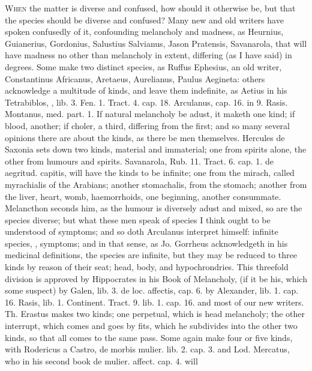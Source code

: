 {{\lettrine{W}{hen} the matter is diverse and confused, how should it otherwise be, but
that the species should be diverse and confused? Many new and old
writers have spoken confusedly of it, confounding melancholy and
madness, as Heurnius, Guianerius, Gordonius, Salustius
Salvianus, Jason Pratensis, Savanarola, that will have madness no other
than melancholy in extent, differing (as I have said) in degrees. Some
make two distinct species, as Ruffus Ephesius, an old writer,
Constantinus Africanus, Aretaeus, Aurelianus, Paulus
Aegineta: others acknowledge a multitude of kinds, and leave them
indefinite, as Aetius in his Tetrabiblos, \Avicenna{}, lib. 3. Fen.
1. Tract. 4. cap. 18. Arculanus, cap. 16. in 9. Rasis. Montanus, med.
part. 1. If natural melancholy be adust, it maketh one kind; if
blood, another; if choler, a third, differing from the first; and so
many several opinions there are about the kinds, as there be men
themselves. Hercules de Saxonia sets down two kinds, material and
immaterial; one from spirits alone, the other from humours and spirits.
Savanarola, Rub. 11. Tract. 6. cap. 1. de aegritud. capitis, will have
the kinds to be infinite; one from the mirach, called myrachialis of
the Arabians; another stomachalis, from the stomach; another from the
liver, heart, womb, haemorrhoids, one beginning, another
consummate. Melancthon seconds him, as the humour is diversely
adust and mixed, so are the species diverse; but what these men speak of
species I think ought to be understood of symptoms; and so doth 
Arculanus interpret himself: infinite species, \ie{}, symptoms; and in
that sense, as Jo. Gorrheus acknowledgeth in his medicinal definitions,
the species are infinite, but they may be reduced to three kinds by
reason of their seat; head, body, and hypochrondries. This threefold
division is approved by Hippocrates in his Book of Melancholy, (if it
be his, which some suspect) by Galen, lib. 3. de loc. affectis, cap. 6.
by Alexander, lib. 1. cap. 16. Rasis, lib. 1. Continent. Tract. 9. lib.
1. cap. 16. \Avicenna{} and most of our new writers. Th. Erastus makes two
kinds; one perpetual, which is head melancholy; the other interrupt,
which comes and goes by fits, which he subdivides into the other two
kinds, so that all comes to the same pass. Some again make four or five
kinds, with Rodericus a Castro, de morbis mulier. lib. 2. cap. 3. and
Lod. Mercatus, who in his second book de mulier. affect. cap. 4. will
}}
